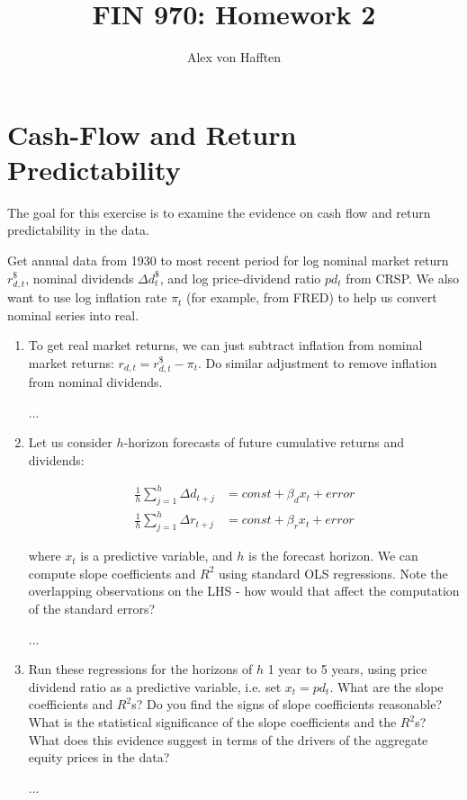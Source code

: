 \documentclass{article}
\title{FIN 970: Homework 2}
\author{Alex von Hafften }
\begin{document}
\maketitle

\section{Cash-Flow and Return Predictability}

The goal for this exercise is to examine the evidence on cash flow and return predictability in the data.

\bigskip

Get annual data from 1930 to most recent period for log nominal market return $r_{d,t}^{\$}$, nominal dividends $\Delta d_{t}^{\$}$, and log price-dividend ratio $pd_t$ from CRSP. We also want to use log inflation rate $\pi_t$ (for example, from FRED) to help us convert nominal series into real.

\begin{enumerate}

\item To get real market returns, we can just subtract inflation from nominal market returns: $r_{d,t} = r^{\$}_{d,t} - \pi_t$. Do similar adjustment to remove inflation from nominal dividends.

...

\item Let us consider $h$-horizon forecasts of future cumulative returns and dividends:

\begin{align*}
\frac{1}{h} \sum_{j=1}^h \Delta d_{t+j} &= const + \beta_d x_t + error \\
\frac{1}{h} \sum_{j=1}^h \Delta r_{t+j} &= const + \beta_r x_t + error
\end{align*}

where $x_t$ is a predictive variable, and $h$ is the forecast horizon. We can compute slope coefficients and $R^2$ using standard OLS regressions.  Note the overlapping observations on the LHS - how would that affect the computation of the standard errors?

...

\item Run these regressions for the horizons of $h$ 1 year to 5 years, using price dividend ratio as a predictive variable, i.e. set $x_t = pd_t$. What are the slope coefficients and $R^2$s? Do you find the signs of slope coefficients reasonable? What is the statistical significance of the slope coefficients and the $R^2$s? What does this evidence suggest in terms of the drivers of the aggregate equity prices in the data?

...

\end{enumerate}
\end{document}

